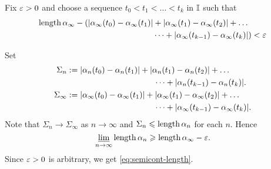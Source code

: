 Fix $\varepsilon > 0$ and choose a sequence $t_0<t_1<\dots<t_k$ in $\mathbb{I}$
such that 
\begin{align*}
\mathop{\rm length}\nolimits\alpha_\infty-
(|\alpha_\infty(t_0)-\alpha_\infty(t_1)|&+|\alpha_\infty(t_1)-\alpha_\infty(t_2)|+\dots
\\
&\dots+|\alpha_\infty(t_{k-1})-\alpha_\infty(t_k)|)<\varepsilon
\end{align*}


Set 
\begin{align*}\Sigma_n
&\df
|\alpha_n(t_0)-\alpha_n(t_1)|+|\alpha_n(t_1)-\alpha_n(t_2)|+\dots
\\
&\ \ \ \ \ \ \ \ \ \ \ \ \ \ \ \ \ \ \ \ \ \ \ \ \ \ \ \ \ \ \ \ \dots+|\alpha_n(t_{k-1})-\alpha_n(t_k)|.
\\
\Sigma_\infty
&\df
|\alpha_\infty(t_0)-\alpha_\infty(t_1)|+|\alpha_\infty(t_1)-\alpha_\infty(t_2)|+\dots
\\
&\ \ \ \ \ \ \ \ \ \ \ \ \ \ \ \ \ \ \ \ \ \ \ \ \ \ \ \ \ \ \ \ \dots+|\alpha_\infty(t_{k-1})-\alpha_\infty(t_k)|.
\end{align*}
Note that $\Sigma_n\to \Sigma_\infty$ as $n\to\infty$
and $\Sigma_n\leqslant\mathop{\rm length}\nolimits\alpha_n$ for each $n$.
Hence
$$\varliminf_{n\to\infty} \mathop{\rm length}\nolimits\alpha_n \geqslant \mathop{\rm length}\nolimits\alpha_\infty-\varepsilon.$$
Since $\varepsilon>0$ is arbitrary, we get \ref{eq:semicont-length}.\qeds




